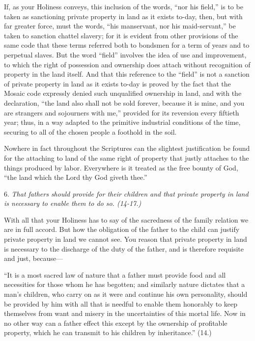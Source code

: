 \documentclass{book}
\begin{document}
If, as your Holiness conveys, this inclusion of the words, “nor his field,” is to be taken as sanctioning private property in land as it exists to-day, then, but with far greater force, must the words, “his manservant, nor his maid-servant,” be taken to sanction chattel slavery; for it is evident from other provisions of the same code that these terms referred both to bondsmen for a term of years and to perpetual slaves. But the word “field” involves the idea of use and improvement, to which the right of possession and ownership does attach without recognition of property in the land itself. And that this reference to the “field” is not a sanction of private property in land as it exists to-day is proved by the fact that the Mosaic code expressly denied such unqualified ownership in land, and with the declaration, “the land also shall not be sold forever, because it is mine, and you are strangers and sojourners with me,” provided for its reversion every fiftieth year; thus, in a way adapted to the primitive industrial conditions of the time, securing to all of the chosen people a foothold in the soil.

Nowhere in fact throughout the Scriptures can the slightest justification be found for the attaching to land of the same right of property that justly attaches to the things produced by labor. Everywhere is it treated as the free bounty of God, “the land which the Lord thy God giveth thee.”

6. \emph{That fathers should provide for their children and that private property in land is necessary to enable them to do so. (14-17.)}

With all that your Holiness has to say of the sacredness of the family relation we are in full accord. But how the obligation of the father to the child can justify private property in land we cannot see. You reason that private property in land is necessary to the discharge of the duty of the father, and is therefore requisite and just, because—

“It is a most sacred law of nature that a father must provide food and all necessities for those whom he has begotten; and similarly nature dictates that a man’s children, who carry on as it were and continue his own personality, should be provided by him with all that is needful to enable them honorably to keep themselves from want and misery in the uncertainties of this mortal life. Now in no other way can a father effect this except by the ownership of profitable property, which he can transmit to his children by inheritance.” (14.)
\end{document}
